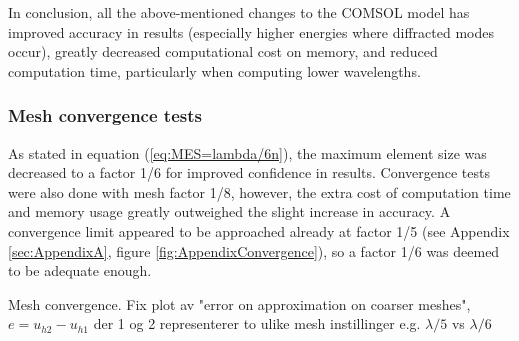 In conclusion, all the above-mentioned changes to the COMSOL model has improved accuracy in results (especially higher energies where diffracted modes occur), greatly decreased  computational cost on memory, and reduced computation time, particularly when computing lower wavelengths.



\subsubsection*{Mesh convergence tests}
As stated in equation (\ref{eq:MES=lambda/6n}), the maximum element size was decreased to a factor 1/6 for improved confidence in results. Convergence tests were also done with mesh factor 1/8, however, the extra cost of computation time and memory usage greatly outweighed the slight increase in accuracy. A convergence limit appeared to be approached already at factor 1/5 (see Appendix \ref{sec:AppendixA}, figure \ref{fig:AppendixConvergence}), so a factor 1/6 was deemed to be adequate enough.




    Mesh convergence. Fix plot av "error on approximation on coarser meshes", $e=u_{h2}-u_{h1}$ der 1 og 2 representerer to ulike mesh instillinger e.g. $\lambda/5$ vs $\lambda/6$ %


